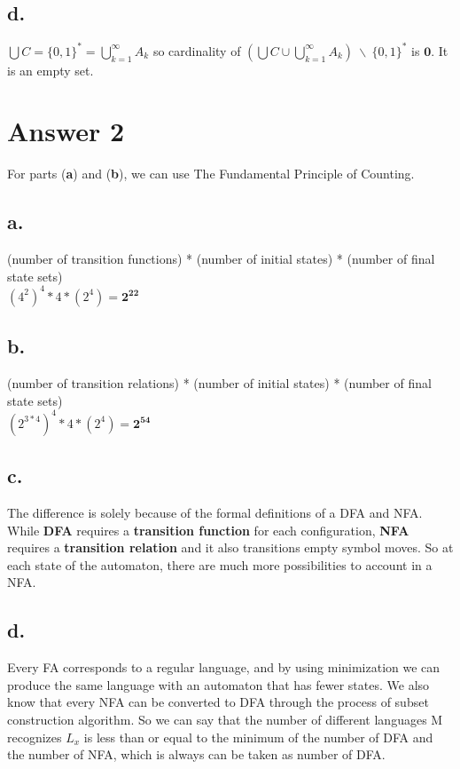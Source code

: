 \documentclass[12pt]{article}
\begin{document}
\subsection*{d.}
\qquad $\bigcup C = \{0, 1\}^* = \bigcup_{k=1}^{\infty}A_k$ so cardinality of $(\bigcup C \cup \bigcup_{k=1}^{\infty}A_k)\ \backslash\ \{0, 1\}^*$ is $\boldsymbol{0}$. It is an empty set.

\section*{Answer 2}
\qquad For parts (\textbf{a}) and (\textbf{b}), we can use The Fundamental Principle of Counting.
\subsection*{a.}
\begin{center}
  (number of transition functions) * (number of initial states) * (number of final state sets)\\
  \bigskip
  $(4^2)^4 * 4 * (2^4) = \boldsymbol{2^{22}}$
\end{center}

\subsection*{b.}
\begin{center}
  (number of transition relations) * (number of initial states) * (number of final state sets)\\
  \bigskip
  $(2^{3*4})^4 * 4 * (2^4) = \boldsymbol{2^{54}}$
\end{center}

\subsection*{c.}
\qquad The difference is solely because of the formal definitions of a DFA and NFA. While \textbf{DFA} requires a \textbf{transition function} for each configuration, \textbf{NFA} requires a \textbf{transition relation} and it also transitions empty symbol moves. So at each state of the automaton, there are much more possibilities to account in a NFA.

\subsection*{d.}
\qquad Every FA corresponds to a regular language, and by using minimization we can produce the same language with an automaton that has fewer states. We also know that every NFA can be converted to DFA through the process of subset construction algorithm. So we can say that the number of different languages M recognizes $L_x$ is less than or equal to the minimum of the number of DFA and the number of NFA, which is always can be taken as number of DFA.
\end{document}
